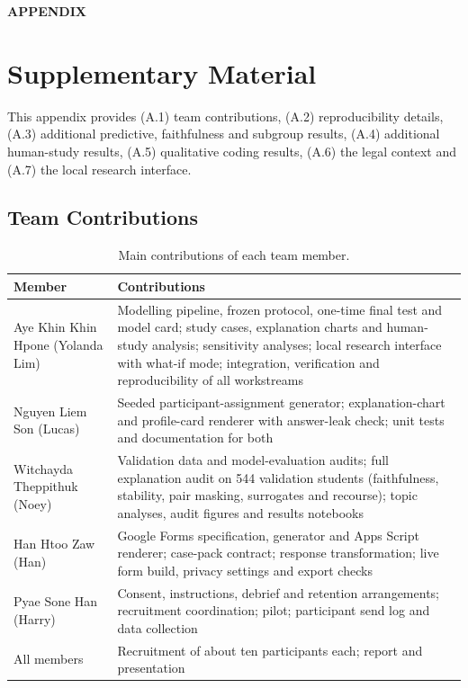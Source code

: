 \FloatBarrier
\clearpage
\onecolumn
\appendix

\begin{center}
{\Large \textbf{APPENDIX}}
\end{center}

\section{Supplementary Material}
\label{sec:appendix}

This appendix provides (A.1) team contributions, (A.2) reproducibility details, (A.3) additional
predictive, faithfulness and subgroup results, (A.4) additional human-study results, (A.5) qualitative
coding results, (A.6) the legal context and (A.7) the local research interface.

\subsection{Team Contributions}
\label{sec:app-contrib}

\begin{table}[H]
\centering
\caption{Main contributions of each team member.}
\label{tab:contributions}
\footnotesize
\begin{tabular}{@{}p{4.6cm}p{11.0cm}@{}}
\toprule
\textbf{Member} & \textbf{Contributions} \\
\midrule
Aye Khin Khin Hpone (Yolanda Lim) & Modelling pipeline, frozen protocol, one-time final test and model card; study cases, explanation charts and human-study analysis; sensitivity analyses; local research interface with what-if mode; integration, verification and reproducibility of all workstreams \\
Nguyen Liem Son (Lucas) & Seeded participant-assignment generator; explanation-chart and profile-card renderer with answer-leak check; unit tests and documentation for both \\
Witchayda Theppithuk (Noey) & Validation data and model-evaluation audits; full explanation audit on 544 validation students (faithfulness, stability, pair masking, surrogates and recourse); topic analyses, audit figures and results notebooks \\
Han Htoo Zaw (Han) & Google Forms specification, generator and Apps Script renderer; case-pack contract; response transformation; live form build, privacy settings and export checks \\
Pyae Sone Han (Harry) & Consent, instructions, debrief and retention arrangements; recruitment coordination; pilot; participant send log and data collection \\
\midrule
All members & Recruitment of about ten participants each; report and presentation \\
\bottomrule
\end{tabular}
\end{table}

